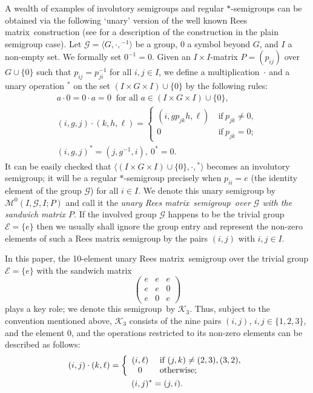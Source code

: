 \documentclass[11pt,reqno]{amsart}
\numberwithin{equation}{section}
\theoremstyle{remark}
\def\cal{\mathcal}
\def\Mc{{\cal M}}
\def\Rm{Rees matrix}
\def\sm{semi\-group}
\begin{document}
A wealth of examples of involutory semigroups and regular
$*$-semigroups can be obtained via the following `unary' version
of the well known \Rm\ construction (see \cite[Section~3.1]{CP}
for a description of the construction in the plain semigroup
case). Let $\mathcal{G}=\langle G,\cdot,{}^{-1}\rangle$ be a
group, $0$ a symbol beyond $G$, and $I$ a non-empty set. We
formally set $0^{-1}=0$. Given an $I\times I$-matrix $P=(p_{ij})$
over $G\cup\{0\}$ such that $p_{ij}=p_{ji}^{-1}$ for all $i,j\in
I$, we define a multiplication~$\cdot$ and a unary operation
${}^*$ on the set $(I\times G\times I)\cup\{0\}$ by the following
rules:
\begin{gather*}
a\cdot 0=0\cdot a=0\ \text{ for all $a\in (I\times G\times I)\cup \{0\}$},\\
(i,g,j)\cdot(k,h,\ell)=\left\{\begin{array}{cl}
(i,gp_{jk}h,\ell)&\ \text{if}\ p_{jk}\ne0,\\
0 &\ \text{if}\ p_{jk}=0;
\end{array}\right.\\
(i,g,j)^* = (j,g^{-1},i),\ 0^* = 0.
\end{gather*}
It can be easily checked that $\langle(I\times G\times I)\cup
\{0\},\cdot,{}^*\rangle$ becomes  an involutory semigroup; it will
be a regular $*$-semigroup precisely when $p_{ii}=e$ (the identity
element of the group $\mathcal{G}$) for all $i\in I$. We denote
this unary semigroup  by $\Mc^0(I,\mathcal{G},I;P)$ and call it
the \emph{unary \Rm\ \sm\ over $\mathcal{G}$ with the sandwich
matrix $P$}. If the involved group $\mathcal G$ happens to be the
trivial group $\mathcal{E}=\{e\}$ then we usually shall ignore the
group entry and represent the non-zero elements of such a Rees
matrix semigroup by the pairs $(i,j)$ with $i,j\in I$.

In this paper, the 10-element unary \Rm\ semigroup over the
trivial group $\mathcal{E}=\{e\}$ with the sandwich matrix
$$\begin{pmatrix}
e & e & e\\
e & e & 0\\
e & 0 & e
\end{pmatrix}$$
plays a key role; we denote this \sm\ by $\mathcal{K}_3$. Thus,
subject to the convention mentioned above, $\mathcal{K}_3$
consists of the nine pairs $(i,j)$, $i,j\in\{1,2,3\}$, and the
element $0$, and the operations restricted to its non-zero
elements can be described as follows:
\begin{gather}
\label{operations in C3}
(i,j)\cdot(k,\ell)=\left\{\begin{array}{cl}
(i,\ell)&\ \text{if}\ (j,k)\ne(2,3),(3,2),\\
0 &\ \text{otherwise};
\end{array}\right.\\
(i,j)^* = (j,i)\notag.
\end{gather}
\end{document}
